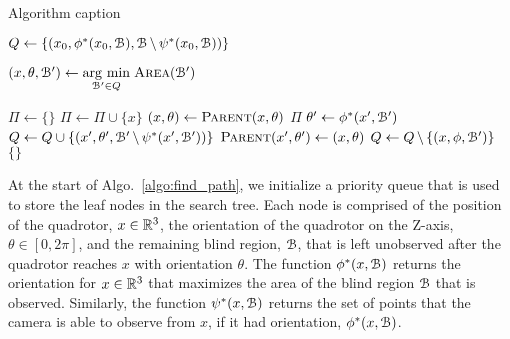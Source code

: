 \begin{algorithm}[h!]
    \caption{Algorithm caption}
    \label{algo:find_path}
    \begin{algorithmic}[1]
        \setcounter{ALC@line}{0}

        \STATE $Q \leftarrow \{(x_0, \phi^*(x_0, {{\mathcal{B}}}),
            {{\mathcal{B}}} \, \backslash \, \psi^*(x_0, {{\mathcal{B}}}))\}$

        \STATE $(x, \theta, {{\mathcal{B'}}}) \leftarrow \underset{{{\mathcal{B'}}} \in Q}{\operatorname{arg}\,\operatorname{min}}\; {\textsc{Area}}({{\mathcal{B'}}})$

                \STATE $\Pi \leftarrow \{\}$
                    \STATE $\Pi \leftarrow \Pi \cup \{x\}$
                    \STATE $(x, \theta) \leftarrow {\textsc{Parent}}(x, \theta)$
                \ENDWHILE
                \RETURN $\Pi$
            \ENDIF
            \STATE $\theta' \leftarrow \phi^*(x', {{\mathcal{B'}}})$
            \STATE $Q \leftarrow Q \cup \{(x', \theta', {{\mathcal{B'}}} \, \backslash \,
                    \psi^*(x', {{\mathcal{B'}}}))\}$
                \STATE ${\textsc{Parent}}(x', \theta') \leftarrow (x, \theta)$
            \ENDFOR
            \STATE $Q \leftarrow Q \, \backslash \, \{(x, \phi, {{\mathcal{B'}}})\}$
        \ENDWHILE
        \RETURN $\{\}$

    \end{algorithmic}
\end{algorithm}

At the start of Algo.~\ref{algo:find_path}, we initialize a priority queue that
is used to store the leaf nodes in the search tree. Each node is comprised of
the position of the quadrotor, $x \in \mathbb{R}^3$, the orientation of the quadrotor
on the Z-axis, $\theta \in [0, 2\pi]$, and the remaining blind region, ${{\mathcal{B}}}$,
that is left unobserved after the quadrotor reaches $x$ with orientation
$\theta$. The function $\phi^*(x, {{\mathcal{B}}})$ returns the orientation for $x \in
\mathbb{R}^3$ that maximizes the area of the blind region ${{\mathcal{B}}}$ that is observed.
Similarly, the function $\psi^*(x, {{\mathcal{B}}})$ returns the set of points that the
camera is able to observe from $x$, if it had orientation, $\phi^*(x, {{\mathcal{B}}})$.

